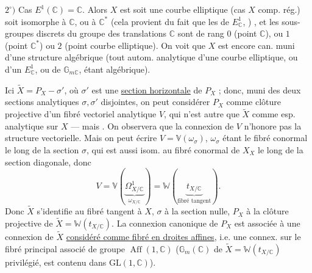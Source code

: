 $2^\circ)$ Cas $E^1(\mathbb C)=\mathbb C$. Alors $X$ est soit  une courbe elliptique (cas $X$ comp. rég.) soit isomorphe à $\mathbb C$, ou à $\mathbb C^*$ (cela provient du fait que les  de  $E^1_{\mathbb C}$, )  , et les sous-groupes discrets  du groupe des translations $\mathbb C$ sont de rang $0$ (point $\mathbb C$), ou $1$ (point $\mathbb C^*$) ou $2$ (point courbe elliptique). On voit que $X$ est encore can. muni d'une structure algébrique (tout autom. analytique d'une courbe elliptique, ou d'un $E^1_{\mathbb C}$, ou de $\mathbb G_{m\mathbb C}$, étant algébrique).


Ici $\widetilde X=P_X-\sigma'$, où $\sigma'$ est une \uline{section horizontale} de $P_X$ ; donc,  muni des deux sections analytiques $\sigma,\sigma'$ disjointes, on peut considérer $P_X$ comme clôture projective d'un fibré vectoriel analytique $V$, qui n'est autre que $\widetilde X$ comme esp. analytique sur $X$ --- mais . On observera que la connexion de $V$  n'honore pas la structure vectorielle. Mais on peut
écrire $V=\mathbb V(\omega_\sigma)$, $\omega_\sigma$ étant le fibré conormal le long de la section $\sigma$, qui est aussi isom. au fibré conormal de $X_X$ le long de la section diagonale, donc
\[
V=\mathbb V(\underbrace{\Omega^1_{X/\mathbb C}}_{\omega_{X/\mathbb C}})=\mathbb W(\underbrace{t_{X/\mathbb C}}_{\text{fibré tangent}}).
\]
Donc $\widetilde X$ s'identifie au fibré tangent à $X$, $\sigma$ à la section nulle, $P_X$ à la clôture projective de $\widetilde X=\mathbb W(t_{X/\mathbb C})$. La connexion  canonique de $P_X$ est associée à une connexion de $\widetilde X$ \uline{considéré comme fibré en droites affines}, i.e. une connex. sur le fibré principal associé de groupe $\operatorname{Aff}(1,\mathbb C)$ ($\mathbb G_m(\mathbb C)$ de $\widetilde X=\mathbb W(t_{X/\mathbb C})$ privilégié, est contenu dans $\mathrm{GL}(1,\mathbb C)$).

